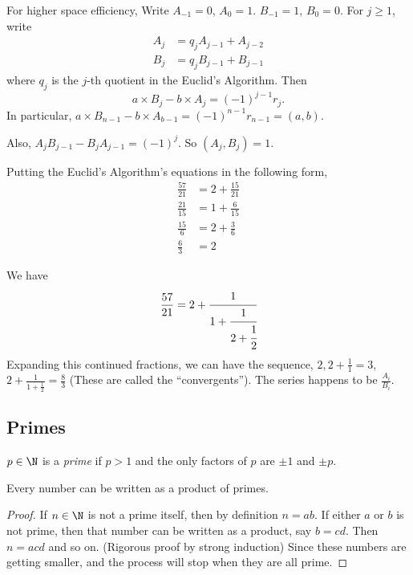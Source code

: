 \documentclass[a4paper]{article}
\begin{document}
  For higher space efficiency, Write $A_{-1} = 0$, $A_0 = 1$. $B_{-1} = 1$, $B_0 = 0$. For $j \geq 1$, write
  \begin{align*}
    A_j &= q_jA_{j-1} + A_{j - 2}\\
    B_j &= q_jB_{j-1} + B_{j-1}
  \end{align*}
  where $q_j$ is the $j$-th quotient in the Euclid's Algorithm. Then
  \[
    a\times B_j - b\times A_j = (-1)^{j-1}r_j.
  \]
  In particular, $a\times B_{n-1} - b\times A_{b-1} = (-1)^{n-1}r_{n - 1} = (a, b)$.

  Also, $A_jB_{j - 1} - B_jA_{j-1} = (-1)^j$. So $(A_j, B_j) = 1$.

  Putting the Euclid's Algorithm's equations in the following form, 
  \begin{align*}
    \frac{57}{21} &= 2 + \frac{15}{21}\\
    \frac{21}{15} &= 1 + \frac{6}{15}\\
    \frac{15}{6} &= 2 + \frac{3}{6}\\
    \frac{6}{3} &= 2
  \end{align*}

  We have 
  \[
    \frac{57}{21} = 2 + \cfrac{1}{1 + \cfrac{1}{2 + \cfrac{1}{2}}}
  \]
  Expanding this continued fractions, we can have the sequence, $2, 2 + \frac{1}{1} = 3$, $2 + \frac{1}{1 + \frac{1}{2}} = \frac{8}{3}$ (These are called the ``convergents''). The series happens to be $\frac{A_i}{B_i}$.

  \subsection{Primes}
  \begin{defi}
    $p\in \N$ is a \emph{prime} if $p > 1$ and the only factors of $p$ are $\pm 1$ and $\pm p$.
  \end{defi}

  \begin{thm}
    Every number can be written as a product of primes.
  \end{thm}

  \begin{proof}
    If $n\in \N$ is not a prime itself, then by definition $n = ab$. If either $a$ or $b$ is not prime, then that number can be written as a product, say $b = cd$. Then $n = acd$ and so on. (Rigorous proof by strong induction) Since these numbers are getting smaller, and the process will stop when they are all prime.
  \end{proof}
\end{document}

